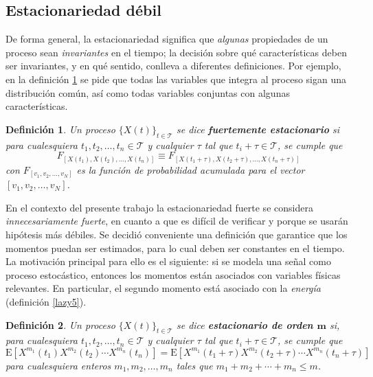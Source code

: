 \documentclass[12pt,letterpaper]{book}
\newtheorem{definicion}{Definición}[chapter]
\newcommand{\E}[1]{\mathrm{E}\left[ #1 \right]}
\newcommand{\xt}{$\{X(t)\}_{t\in \mathcal{T}}$ }
\begin{document}
\subsection{Estacionariedad débil}

De forma general, la estacionariedad significa que \textit{algunas} propiedades de un proceso sean \textit{invariantes} en el tiempo; la decisión sobre qué características deben ser invariantes, y en qué sentido, conlleva a diferentes definiciones.
%
Por ejemplo, en la definición \ref{est_fuerte} se pide que todas las variables que integra al proceso sigan una distribución común, así como todas variables conjuntas con algunas características.

\begin{definicion}%
Un proceso \xt se dice \textbf{fuertemente estacionario} si para cualesquiera $t_1, t_2, \dots, t_n \in \mathcal{T}$ y cualquier $\tau$ tal que $t_i + \tau \in \mathcal{T}$, se cumple que
\begin{equation*}
F_{\left[ X(t_1), X(t_2), \dots, X(t_n) \right]} \equiv
F_{\left[ X(t_1 + \tau), X(t_2 + \tau), \dots, X(t_n + \tau) \right]}
\end{equation*}
con $F_{[v_1,v_2,\dots,v_N]}$ es la función de probabilidad acumulada para el vector $[v_1,v_2,\dots,v_N]$.
\label{est_fuerte}
\end{definicion}

En el contexto del presente trabajo la estacionariedad fuerte se considera \textit{innecesariamente fuerte}, en cuanto a que es difícil de verificar y porque se usarán hipótesis más débiles.
%
Se decidió conveniente una definición que garantice que los momentos puedan ser estimados, para lo cual deben ser constantes en el tiempo.
%
La motivación principal para ello es el siguiente: si se modela una señal como proceso estocástico, entonces los momentos están asociados con variables físicas relevantes. 
%
En particular, el segundo momento está asociado con la \textit{energía} (definición \ref{lazy5}).

\begin{definicion}%
Un proceso \xt se dice \textbf{estacionario de orden $\boldsymbol{m}$} si, para cualesquiera $t_1, t_2, \dots, t_n \in \mathcal{T}$ y cualquier $\tau$ tal que $t_i + \tau \in \mathcal{T}$, se cumple que
\begin{equation*}
\E{X^{m_1}(t_1)X^{m_2}(t_2)\cdots X^{m_n}(t_n)} =
\E{X^{m_1}(t_1+\tau)X^{m_2}(t_2+\tau)\cdots X^{m_n}(t_n+\tau)}
\end{equation*}
para cualesquiera enteros $m_1, m_2, \dots, m_n$ tales que $m_1+m_2+\cdots+m_n \leq m$.
\label{est_m}
\end{definicion}
\end{document}
